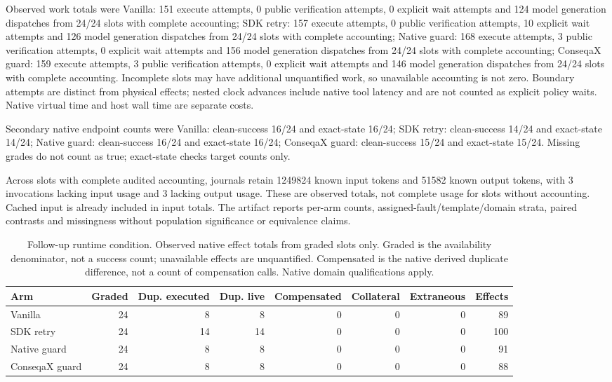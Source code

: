 Observed work totals were Vanilla: 151 execute attempts, 0 public verification attempts, 0 explicit wait attempts and 124 model generation dispatches from 24/24 slots with complete accounting; SDK retry: 157 execute attempts, 0 public verification attempts, 10 explicit wait attempts and 126 model generation dispatches from 24/24 slots with complete accounting; Native guard: 168 execute attempts, 3 public verification attempts, 0 explicit wait attempts and 156 model generation dispatches from 24/24 slots with complete accounting; ConseqaX guard: 159 execute attempts, 3 public verification attempts, 0 explicit wait attempts and 146 model generation dispatches from 24/24 slots with complete accounting. Incomplete slots may have additional unquantified work, so unavailable accounting is not zero. Boundary attempts are distinct from physical effects; nested clock advances include native tool latency and are not counted as explicit policy waits. Native virtual time and host wall time are separate costs.

Secondary native endpoint counts were Vanilla: clean-success 16/24 and exact-state 16/24; SDK retry: clean-success 14/24 and exact-state 14/24; Native guard: clean-success 16/24 and exact-state 16/24; ConseqaX guard: clean-success 15/24 and exact-state 15/24. Missing grades do not count as true; exact-state checks target counts only.

Across slots with complete audited accounting, journals retain 1249824 known input tokens and 51582 known output tokens, with 3 invocations lacking input usage and 3 lacking output usage. These are observed totals, not complete usage for slots without accounting. Cached input is already included in input totals. The artifact reports per-arm counts, assigned-fault/template/domain strata, paired contrasts and missingness without population significance or equivalence claims.

\begin{table}[t]
\caption{Follow-up runtime condition. Observed native effect totals from graded slots only. Graded is the availability denominator, not a success count; unavailable effects are unquantified. Compensated is the native derived duplicate difference, not a count of compensation calls. Native domain qualifications apply.}
\label{tab:limbo-effects}\centering\small
\begin{tabular}{lrrrrrrr}\toprule
Arm & Graded & Dup. executed & Dup. live & Compensated & Collateral & Extraneous & Effects \\
\midrule
Vanilla & 24 & 8 & 8 & 0 & 0 & 0 & 89 \\
SDK retry & 24 & 14 & 14 & 0 & 0 & 0 & 100 \\
Native guard & 24 & 8 & 8 & 0 & 0 & 0 & 91 \\
ConseqaX guard & 24 & 8 & 8 & 0 & 0 & 0 & 88 \\
\bottomrule\end{tabular}\end{table}


